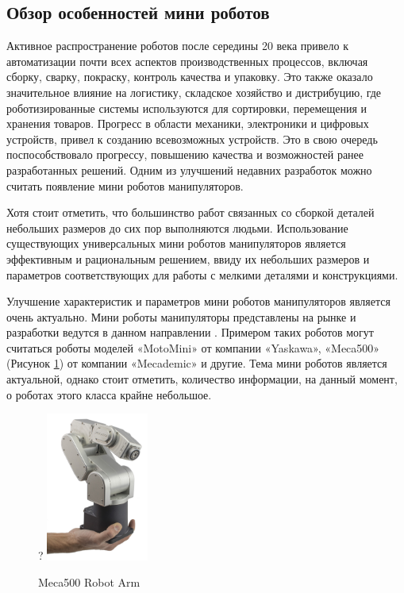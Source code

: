 \subsection{Обзор особенностей мини роботов}

Активное распространение роботов после середины 20 века привело к автоматизации почти всех аспектов производственных процессов, включая сборку, сварку, покраску, контроль качества и упаковку. Это также оказало значительное влияние на логистику, складское хозяйство
и дистрибуцию, где роботизированные системы используются для сортировки, перемещения и
хранения товаров. Прогресс в области механики, электроники и цифровых устройств, привел к
созданию всевозможных устройств. Это в свою очередь поспособствовало прогрессу, повышению качества и возможностей ранее разработанных решений. Одним из улучшений недавних разработок можно считать появление мини роботов манипуляторов.

Хотя стоит отметить, что большинство работ связанных со сборкой деталей небольших размеров до сих пор выполняются людьми. Использование существующих универсальных мини роботов манипуляторов является эффективным и рациональным решением, ввиду их небольших размеров и параметров соответствующих для работы с мелкими деталями и конструкциями. 

Улучшение характеристик и параметров мини роботов манипуляторов является очень актуально.
Мини роботы манипуляторы представлены на рынке и разработки ведутся в данном направлении \citep{Li2022}. Примером таких роботов могут считаться роботы моделей «MotoMini» от компании «Yaskawa», «Meca500» (Рисунок \ref{meca}) от компании «Mecademic»  и другие. Тема мини роботов является актуальной, однако стоит отметить, количество информации, на данный момент, о роботах этого класса крайне небольшое.

\begin{figure}[H]
	\centering?
	\includegraphics[width=0.3\textwidth]{Src/images/Meca500.jpg}
	\caption{Meca500 Robot Arm}
	\label{meca}
\end{figure}

